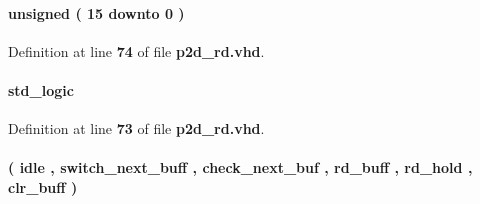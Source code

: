 \paragraph[{rd\+\_\+cnt}]{ {\bfseries \textcolor{comment}{unsigned}\textcolor{vhdlchar}{ }\textcolor{vhdlchar}{(}\textcolor{vhdlchar}{ }\textcolor{vhdlchar}{ } \textcolor{vhdldigit}{15} \textcolor{vhdlchar}{ }\textcolor{keywordflow}{downto}\textcolor{vhdlchar}{ }\textcolor{vhdlchar}{ } \textcolor{vhdldigit}{0} \textcolor{vhdlchar}{ }\textcolor{vhdlchar}{)}\textcolor{vhdlchar}{ }} \hspace{0.3cm}{\ttfamily [Signal]}}\label{classp2d__rd_1_1arch_af5be04f4cbd9617af7593178c4eb06d2}


Definition at line {\bf 74} of file {\bf p2d\+\_\+rd.\+vhd}.

\paragraph[{rd\+\_\+req\+\_\+int}]{ {\bfseries \textcolor{comment}{std\+\_\+logic}\textcolor{vhdlchar}{ }} \hspace{0.3cm}{\ttfamily [Signal]}}\label{classp2d__rd_1_1arch_a6faa2ee0c26e57a725efc97618f7c659}


Definition at line {\bf 73} of file {\bf p2d\+\_\+rd.\+vhd}.

\paragraph[{state\+\_\+type}]{ {\bfseries \textcolor{vhdlchar}{(}\textcolor{vhdlchar}{ }\textcolor{vhdlchar}{idle}\textcolor{vhdlchar}{ }\textcolor{vhdlchar}{,}\textcolor{vhdlchar}{ }\textcolor{vhdlchar}{switch\+\_\+next\+\_\+buff}\textcolor{vhdlchar}{ }\textcolor{vhdlchar}{,}\textcolor{vhdlchar}{ }\textcolor{vhdlchar}{check\+\_\+next\+\_\+buf}\textcolor{vhdlchar}{ }\textcolor{vhdlchar}{,}\textcolor{vhdlchar}{ }\textcolor{vhdlchar}{rd\+\_\+buff}\textcolor{vhdlchar}{ }\textcolor{vhdlchar}{,}\textcolor{vhdlchar}{ }\textcolor{vhdlchar}{rd\+\_\+hold}\textcolor{vhdlchar}{ }\textcolor{vhdlchar}{,}\textcolor{vhdlchar}{ }\textcolor{vhdlchar}{clr\+\_\+buff}\textcolor{vhdlchar}{ }\textcolor{vhdlchar}{)}\textcolor{vhdlchar}{ }} \hspace{0.3cm}{\ttfamily [Type]}}\label{classp2d__rd_1_1arch_a273a5a9bf08a144c0c76e49541a8b150}


